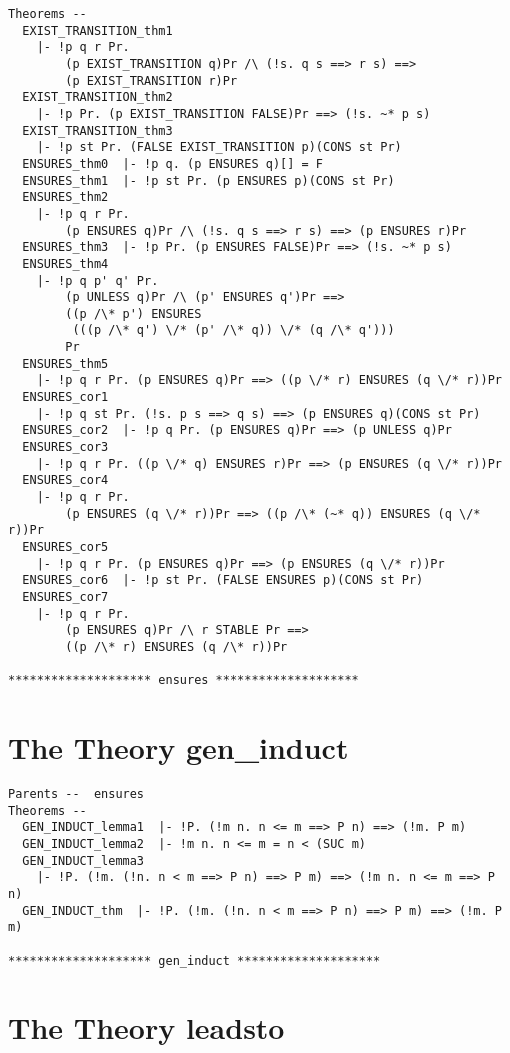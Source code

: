 {\begin{verbatim}
Theorems --
  EXIST_TRANSITION_thm1
    |- !p q r Pr.
        (p EXIST_TRANSITION q)Pr /\ (!s. q s ==> r s) ==>
        (p EXIST_TRANSITION r)Pr
  EXIST_TRANSITION_thm2
    |- !p Pr. (p EXIST_TRANSITION FALSE)Pr ==> (!s. ~* p s)
  EXIST_TRANSITION_thm3
    |- !p st Pr. (FALSE EXIST_TRANSITION p)(CONS st Pr)
  ENSURES_thm0  |- !p q. (p ENSURES q)[] = F
  ENSURES_thm1  |- !p st Pr. (p ENSURES p)(CONS st Pr)
  ENSURES_thm2
    |- !p q r Pr.
        (p ENSURES q)Pr /\ (!s. q s ==> r s) ==> (p ENSURES r)Pr
  ENSURES_thm3  |- !p Pr. (p ENSURES FALSE)Pr ==> (!s. ~* p s)
  ENSURES_thm4
    |- !p q p' q' Pr.
        (p UNLESS q)Pr /\ (p' ENSURES q')Pr ==>
        ((p /\* p') ENSURES
         (((p /\* q') \/* (p' /\* q)) \/* (q /\* q')))
        Pr
  ENSURES_thm5
    |- !p q r Pr. (p ENSURES q)Pr ==> ((p \/* r) ENSURES (q \/* r))Pr
  ENSURES_cor1
    |- !p q st Pr. (!s. p s ==> q s) ==> (p ENSURES q)(CONS st Pr)
  ENSURES_cor2  |- !p q Pr. (p ENSURES q)Pr ==> (p UNLESS q)Pr
  ENSURES_cor3
    |- !p q r Pr. ((p \/* q) ENSURES r)Pr ==> (p ENSURES (q \/* r))Pr
  ENSURES_cor4
    |- !p q r Pr.
        (p ENSURES (q \/* r))Pr ==> ((p /\* (~* q)) ENSURES (q \/* r))Pr
  ENSURES_cor5
    |- !p q r Pr. (p ENSURES q)Pr ==> (p ENSURES (q \/* r))Pr
  ENSURES_cor6  |- !p st Pr. (FALSE ENSURES p)(CONS st Pr)
  ENSURES_cor7
    |- !p q r Pr.
        (p ENSURES q)Pr /\ r STABLE Pr ==>
        ((p /\* r) ENSURES (q /\* r))Pr
  
******************** ensures ********************
\end{verbatim}

\section*{The Theory gen\_induct}

\begin{verbatim}
Parents --  ensures     
Theorems --
  GEN_INDUCT_lemma1  |- !P. (!m n. n <= m ==> P n) ==> (!m. P m)
  GEN_INDUCT_lemma2  |- !m n. n <= m = n < (SUC m)
  GEN_INDUCT_lemma3
    |- !P. (!m. (!n. n < m ==> P n) ==> P m) ==> (!m n. n <= m ==> P n)
  GEN_INDUCT_thm  |- !P. (!m. (!n. n < m ==> P n) ==> P m) ==> (!m. P m)
  
******************** gen_induct ********************
\end{verbatim}

\section*{The Theory leadsto}

}
